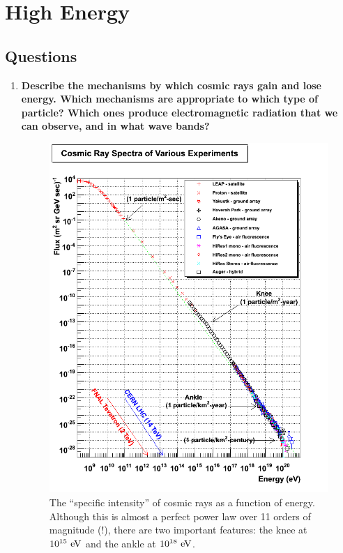 \section{High Energy}
\subsection{Questions}
\begin{enumerate}
\item \textbf{Describe the mechanisms by which cosmic rays gain and lose energy. Which mechanisms
      are appropriate to which type of particle? Which ones produce electromagnetic
      radiation that we can observe, and in what wave bands?}

      \begin{figure}[ht]
      \centering
      \includegraphics[width=\textwidth]{highenergy_cosmic_ray_spectrum}
      \caption{The ``specific intensity'' of cosmic rays as a function of energy.  Although this
               is almost a perfect power law over 11 orders of magnitude (!), there are two
               important features: the knee at $10^{15}~{\rm eV}$ and the ankle at $10^{18}~{\rm eV}$.}
      \label{fig:cosmic_ray_spectrum}
      \end{figure}


\end{enumerate}
